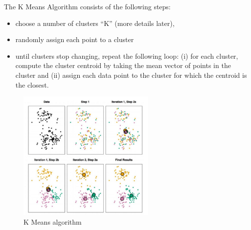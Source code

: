 \documentclass[11pt]{article}
\begin{document}
The K Means Algorithm consists of the following steps:
\begin{itemize}
	\item choose a number of clusters “K” (more details later),
	\item randomly assign each point to a cluster
	\item until clusters stop changing, repeat the following loop: (i) for each cluster, compute the cluster centroid by taking the mean vector of points in the cluster and (ii) assign each data point to the cluster for which the centroid is the closest.
\end{itemize}
\begin{figure}[htbp] 
	\centering
	\includegraphics[width=0.6\textwidth]{pics/k_means_algo_loop}
	\caption{K Means algorithm} 
\end{figure}
\end{document}
